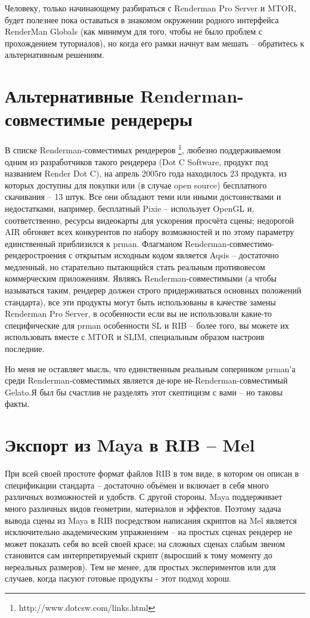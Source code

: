   

 Человеку, только начинающему разбираться с
    Renderman Pro Server и MTOR, будет полезнее пока оставаться в
    знакомом окружении родного интерфейса RenderMan Globals (как
    минимум для того, чтобы не было проблем с прохождением туториалов),
    но когда его рамки начнут вам мешать – обратитесь к альтернативным
    решениям.

  \section*{Альтернативные Renderman-совместимые рендереры}
  

 В списке Renderman-совместимых рендереров \footnote{http://www.dotcsw.com/links.html},
    любезно поддерживаемом одним из разработчиков такого рендерера
    (Dot C Software, продукт
    под названием Render Dot C), на апрель
    2005го года находилось 23 продукта, из которых доступны для покупки
    или (в случае open source) бесплатного скачивания – 13 штук. Все
    они обладают теми или иными достоинствами и недостатками, например,
    бесплатный Pixie – использует OpenGL и, соответственно, ресурсы
    видеокарты для ускорения просчёта сцены; недорогой AIR обгоняет
    всех конкурентов по набору возможностей и по этому параметру
    единственный приблизился к prman. Флагманом
    Renderman-совместимо-рендеростроения с открытым исходным кодом
    является Aqsis – достаточно медленный, но старательно пытающийся
    стать реальным противовесом коммерческим приложениям. Являясь
    Renderman-совместимыми (а чтобы называться таким, рендерер должен
    строго придерживаться основных положений стандарта), все эти
    продукты могут быть использованы в качестве замены Renderman Pro
    Server, в особенности если вы не использовали какие-то
    специфические для prman особенности SL и RIB – более того, вы
    можете их использовать вместе с MTOR и SLIM, специальным образом
    настроив последние.
  

 Но меня не оставляет мысль, что единственным
    реальным соперником prman’а среди Renderman-совместимых является
    де-юре не-Renderman-совместимый Gelato.Я был бы счастлив не
    разделять этот скептицизм с вами – но таковы факты.
 
 \section*{Экспорт из Maya в RIB – Mel}
  

 При всей своей простоте формат файлов RIB в том
    виде, в котором он описан в спецификации стандарта – достаточно
    объёмен и включает в себя много различных возможностей и удобств. С
    другой стороны, Maya поддерживает
    много различных видов геометрии, материалов и эффектов. Поэтому
    задача вывода сцены из Maya в RIB посредством написания скриптов на
    Mel является исключительно академическим упражнением – на простых
    сценах рендерер не может показать себя во всей своей красе; на
    сложных сценах слабым звеном становится сам интерпретируемый скрипт
    (выросший к тому моменту до нереальных размеров). Тем не менее, для
    простых экспериментов или для случаев, когда пасуют готовые
    продукты - этот подход хорош.
  
